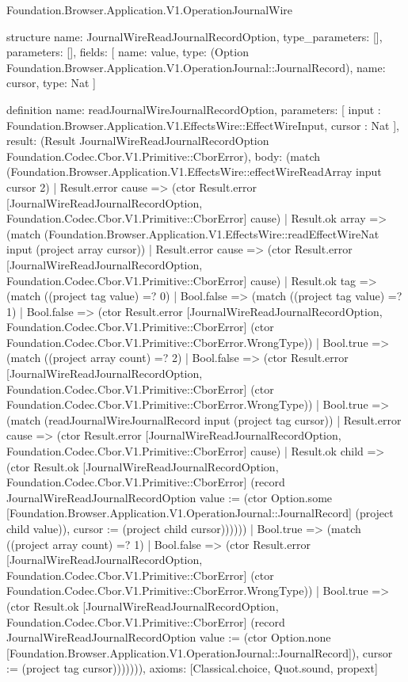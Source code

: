 \begin{lexlean}{Foundation.Browser.Application.V1.OperationJournalWire}
\begin{semanticmodule}
structure{
  name: JournalWireReadJournalRecordOption,
  type_parameters: [],
  parameters: [],
  fields: [
    {name: value, type: (Option Foundation.Browser.Application.V1.OperationJournal::JournalRecord)},
    {name: cursor, type: Nat}
  ]
}

definition{
  name: readJournalWireJournalRecordOption,
  parameters: [
    input : Foundation.Browser.Application.V1.EffectsWire::EffectWireInput,
    cursor : Nat
  ],
  result: (Result JournalWireReadJournalRecordOption Foundation.Codec.Cbor.V1.Primitive::CborError),
  body: (match (Foundation.Browser.Application.V1.EffectsWire::effectWireReadArray input cursor 2)
    | Result.error cause => (ctor Result.error [JournalWireReadJournalRecordOption, Foundation.Codec.Cbor.V1.Primitive::CborError] cause)
    | Result.ok array => (match (Foundation.Browser.Application.V1.EffectsWire::readEffectWireNat input (project array cursor))
      | Result.error cause => (ctor Result.error [JournalWireReadJournalRecordOption, Foundation.Codec.Cbor.V1.Primitive::CborError] cause)
      | Result.ok tag => (match ((project tag value) =? 0)
        | Bool.false => (match ((project tag value) =? 1)
          | Bool.false => (ctor Result.error [JournalWireReadJournalRecordOption, Foundation.Codec.Cbor.V1.Primitive::CborError] (ctor Foundation.Codec.Cbor.V1.Primitive::CborError.WrongType))
          | Bool.true => (match ((project array count) =? 2)
            | Bool.false => (ctor Result.error [JournalWireReadJournalRecordOption, Foundation.Codec.Cbor.V1.Primitive::CborError] (ctor Foundation.Codec.Cbor.V1.Primitive::CborError.WrongType))
            | Bool.true => (match (readJournalWireJournalRecord input (project tag cursor))
              | Result.error cause => (ctor Result.error [JournalWireReadJournalRecordOption, Foundation.Codec.Cbor.V1.Primitive::CborError] cause)
              | Result.ok child => (ctor Result.ok [JournalWireReadJournalRecordOption, Foundation.Codec.Cbor.V1.Primitive::CborError] (record JournalWireReadJournalRecordOption {value := (ctor Option.some [Foundation.Browser.Application.V1.OperationJournal::JournalRecord] (project child value)), cursor := (project child cursor)})))))
        | Bool.true => (match ((project array count) =? 1)
          | Bool.false => (ctor Result.error [JournalWireReadJournalRecordOption, Foundation.Codec.Cbor.V1.Primitive::CborError] (ctor Foundation.Codec.Cbor.V1.Primitive::CborError.WrongType))
          | Bool.true => (ctor Result.ok [JournalWireReadJournalRecordOption, Foundation.Codec.Cbor.V1.Primitive::CborError] (record JournalWireReadJournalRecordOption {value := (ctor Option.none [Foundation.Browser.Application.V1.OperationJournal::JournalRecord]), cursor := (project tag cursor)})))))),
  axioms: [Classical.choice, Quot.sound, propext]
}


\end{semanticmodule}
\end{lexlean}
